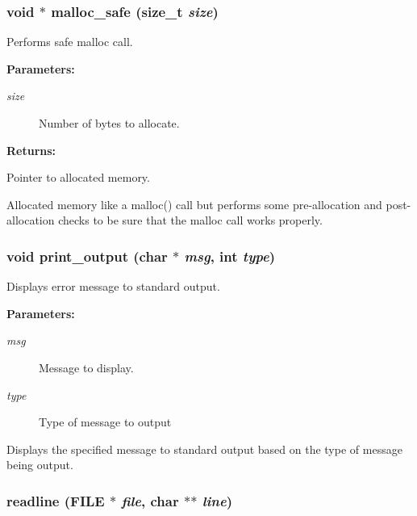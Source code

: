 \subsubsection{\setlength{\rightskip}{0pt plus 5cm}void $\ast$ malloc\_\-safe (size\_\-t {\em size})}\label{util_8c_a19}


Performs safe malloc call.

\begin{Desc}
\item[{\bf Parameters: }]\par
\begin{description}
\item[
{\em size}]Number of bytes to allocate.

\end{description}
\end{Desc}
\begin{Desc}
\item[{\bf Returns: }]\par
Pointer to allocated memory.

\end{Desc}
Allocated memory like a malloc() call but performs some pre-allocation and post-allocation checks to be sure that the malloc call works properly. 
\subsubsection{\setlength{\rightskip}{0pt plus 5cm}void print\_\-output (char $\ast$ {\em msg}, int {\em type})}\label{util_8c_a7}


Displays error message to standard output.

\begin{Desc}
\item[{\bf Parameters: }]\par
\begin{description}
\item[
{\em msg}]Message to display. \item[
{\em type}]Type of message to output

\end{description}
\end{Desc}
Displays the specified message to standard output based on the type of message being output. 
\subsubsection{ readline (FILE $\ast$ {\em file}, char $\ast$$\ast$ {\em line})}\label{util_8c_a13}


